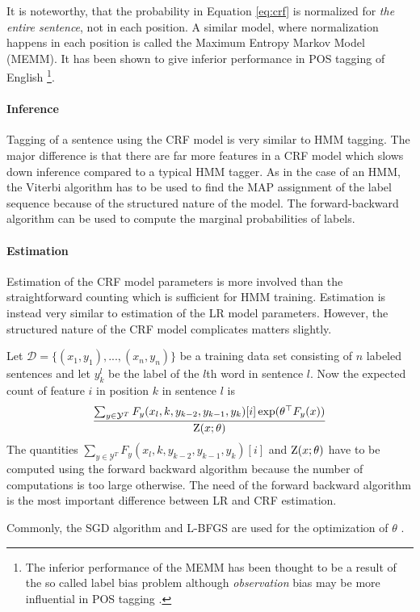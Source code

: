 It is noteworthy, that the probability in Equation \ref{eq:crf} is
normalized for {\it the entire sentence}, not in each position. A
similar model, where normalization happens in each position is called
the Maximum Entropy Markov Model (MEMM). It has been shown to give
inferior performance in POS tagging of English
\citep{Lafferty2001}\footnote{The inferior performance of the MEMM has
  been thought to be a result of the so called label bias problem
  \citep{Lafferty2001} although {\it observation} bias may be more
  influential in POS tagging \citep{Klein2002}.}.

\paragraph{Inference} Tagging of a sentence using the CRF model is
very similar to HMM tagging. The major difference is that there are
far more features in a CRF model which slows down inference compared
to a typical HMM tagger. As in the case of an HMM, the Viterbi
algorithm has to be used to find the MAP assignment of the label
sequence because of the structured nature of the model. The
forward-backward algorithm can be used to compute the marginal
probabilities of labels.

\paragraph{Estimation} Estimation of the CRF model parameters is more
involved than the straightforward counting which is sufficient for HMM
training. Estimation is instead very similar to estimation of the LR
model parameters. However, the structured nature of the CRF model
complicates matters slightly.

Let $\mathcal{D} = \{(x_1, y_1), ..., (x_n, y_n)\}$ be a training data
set consisting of $n$ labeled sentences and let $y_k^l$ be the label
of the $l$th word in sentence $l$. Now the expected count of feature
$i$ in position $k$ in sentence $l$ is
$$\frac{\sum_{y \in \mathcal{Y}^T}F_y(x_l, k, y_{k - 2}, y_{k-1}, y_k)[i] \exp(\theta^\top F_y(x))}{\mbox{${\rm Z}$}(x\mbox{$ ; \, $}\theta)}$$
The quantities $\sum_{y \in \mathcal{Y}^T}F_y(x_l, k, y_{k - 2},
y_{k-1}, y_k)[i]$ and $\mbox{${\rm Z}$}(x\mbox{$ ; \, $}\theta)$ have to be computed using
the forward backward algorithm because the number of computations is
too large otherwise. The need of the forward backward algorithm is the
most important difference between LR and CRF estimation.

Commonly, the SGD algorithm and L-BFGS are used for the optimization
of $\theta$ \citep{Vishwanathan2006}.


